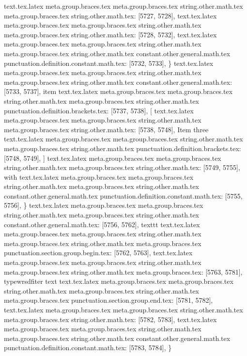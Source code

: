 {{{{{{{{{{{{{{{{{{{{{{{{{{{{{{{{{{{{{{{{{{{{{{{{{{{{{{{{{{{{{{{{{{{{{{{{{{{{{{{{{{{{{{{{{{{{{{{{{{{{{{{{{{{{{{{{{{{{{{{{{{{{{{{{{{{{{{{{{{{{{{{{{{{{{{{{{{{{{text.tex.latex meta.group.braces.tex meta.group.braces.tex string.other.math.tex meta.group.braces.tex string.other.math.tex: [5727, 5728], {
}
text.tex.latex meta.group.braces.tex meta.group.braces.tex string.other.math.tex meta.group.braces.tex string.other.math.tex: [5728, 5732], {    }
text.tex.latex meta.group.braces.tex meta.group.braces.tex string.other.math.tex meta.group.braces.tex string.other.math.tex constant.other.general.math.tex punctuation.definition.constant.math.tex: [5732, 5733], {\}
text.tex.latex meta.group.braces.tex meta.group.braces.tex string.other.math.tex meta.group.braces.tex string.other.math.tex constant.other.general.math.tex: [5733, 5737], {item}
text.tex.latex meta.group.braces.tex meta.group.braces.tex string.other.math.tex meta.group.braces.tex string.other.math.tex punctuation.definition.brackets.tex: [5737, 5738], {[}
text.tex.latex meta.group.braces.tex meta.group.braces.tex string.other.math.tex meta.group.braces.tex string.other.math.tex: [5738, 5748], {Item three}
text.tex.latex meta.group.braces.tex meta.group.braces.tex string.other.math.tex meta.group.braces.tex string.other.math.tex punctuation.definition.brackets.tex: [5748, 5749], {]}
text.tex.latex meta.group.braces.tex meta.group.braces.tex string.other.math.tex meta.group.braces.tex string.other.math.tex: [5749, 5755], { with }
text.tex.latex meta.group.braces.tex meta.group.braces.tex string.other.math.tex meta.group.braces.tex string.other.math.tex constant.other.general.math.tex punctuation.definition.constant.math.tex: [5755, 5756], {\}
text.tex.latex meta.group.braces.tex meta.group.braces.tex string.other.math.tex meta.group.braces.tex string.other.math.tex constant.other.general.math.tex: [5756, 5762], {texttt}
text.tex.latex meta.group.braces.tex meta.group.braces.tex string.other.math.tex meta.group.braces.tex string.other.math.tex meta.group.braces.tex punctuation.section.group.begin.tex: [5762, 5763], {{}
text.tex.latex meta.group.braces.tex meta.group.braces.tex string.other.math.tex meta.group.braces.tex string.other.math.tex meta.group.braces.tex: [5763, 5781], {typewrsdfiter text}
text.tex.latex meta.group.braces.tex meta.group.braces.tex string.other.math.tex meta.group.braces.tex string.other.math.tex meta.group.braces.tex punctuation.section.group.end.tex: [5781, 5782], {}}
text.tex.latex meta.group.braces.tex meta.group.braces.tex string.other.math.tex meta.group.braces.tex string.other.math.tex: [5782, 5783], {
}
text.tex.latex meta.group.braces.tex meta.group.braces.tex string.other.math.tex meta.group.braces.tex string.other.math.tex constant.other.general.math.tex punctuation.definition.constant.math.tex: [5783, 5784], {\}
}}}}}}}}}}}}}}}}}}}}}}}}}}}}}}}}}}}}}}}}}}}}}}}}}}}}}}}}}}}}}}}}}}}}}}}}}}}}}}}}}}}}}}}}}}}}}}}}}}}}}}}}}}}}}}}}}}}}}}}}}}}}}}}}}}}}}}}}}}}}}}}}}}}}}}}}}}}}}}}}
